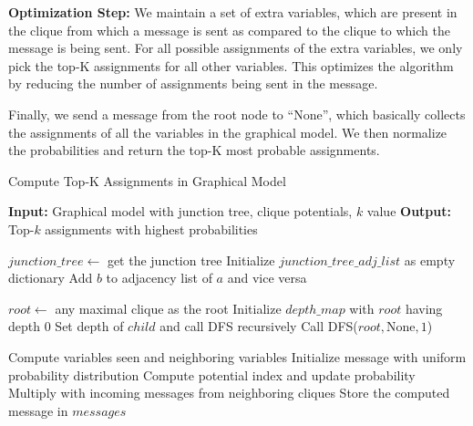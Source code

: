 \documentclass[a4paper,12pt]{article}
\begin{document}
{\bf Optimization Step:} We maintain a set of extra variables, which are present in the clique from which a message is sent as compared to the clique to which the message is being sent. For all possible assignments of the extra variables, we only pick the top-K assignments for all other variables. This optimizes the algorithm by reducing the number of assignments being sent in the message.

Finally, we send a message from the root node to ``None'', which basically collects the assignments of all the variables in the graphical model. We then normalize the probabilities and return the top-K most probable assignments.


\begin{algorithm}
    \caption{Compute Top-K Assignments in Graphical Model}
    \begin{algorithmic}[1]
    \State \textbf{Input:} Graphical model with junction tree, clique potentials, $k$ value
    \State \textbf{Output:} Top-$k$ assignments with highest probabilities
    
    \State $junction\_tree \gets$ get the junction tree
    \State Initialize $junction\_tree\_adj\_list$ as empty dictionary
    \State Add $b$ to adjacency list of $a$ and vice versa
    \EndFor
    
    \State $root \gets$ any maximal clique as the root
    \State Initialize $depth\_map$ with $root$ having depth $0$
    \State Set depth of $child$ and call DFS recursively
    \EndIf
    \EndFor
    \EndProcedure
    \State Call DFS($root, \text{None}, 1$)
    
    \State Compute variables seen and neighboring variables
    \State Initialize message with uniform probability distribution
    \State Compute potential index and update probability
    \State Multiply with incoming messages from neighboring cliques
    \EndFor
    \State Store the computed message in $messages$
    \EndProcedure
    

\end{algorithmic}
\end{algorithm}
\end{document}
